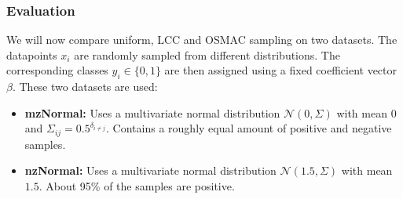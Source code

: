 \subsubsection{Evaluation}%
\label{sec:params:osmac:eval}

We will now compare uniform, LCC and OSMAC sampling on two datasets.
The datapoints \(x_i\) are randomly sampled from different distributions.
The corresponding classes \(y_i \in \{0, 1\}\) are then assigned using a fixed coefficient vector \(\beta\).
These two datasets are used:
\begin{itemize}
	\item \textbf{mzNormal:}
		Uses a multivariate normal distribution \(\mathcal{N}(0, \Sigma)\) with mean \(0\) and \(\Sigma_{i j} = 0.5^{\delta_{i \neq j}}\).
		Contains a roughly equal amount of positive and negative samples.
	\item \textbf{nzNormal:}
		Uses a multivariate normal distribution \(\mathcal{N}(1.5, \Sigma)\) with mean \(1.5\).
		About 95\% of the samples are positive.
\end{itemize}

